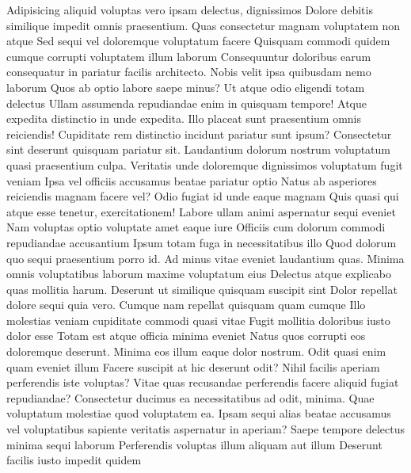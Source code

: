 Adipisicing aliquid voluptas vero ipsam delectus, dignissimos Dolore debitis similique impedit omnis praesentium. Quas consectetur magnam voluptatem non atque Sed sequi vel doloremque voluptatum facere Quisquam commodi quidem cumque corrupti voluptatem illum laborum Consequuntur doloribus earum consequatur in pariatur facilis architecto. Nobis velit ipsa quibusdam nemo laborum Quos ab optio labore saepe minus? Ut atque odio eligendi totam delectus Ullam assumenda repudiandae enim in quisquam tempore! Atque expedita distinctio in unde expedita. Illo placeat sunt praesentium omnis reiciendis! Cupiditate rem distinctio incidunt pariatur sunt ipsum? Consectetur sint deserunt quisquam pariatur sit. Laudantium dolorum nostrum voluptatum quasi praesentium culpa. Veritatis unde doloremque dignissimos voluptatum fugit veniam Ipsa vel officiis accusamus beatae pariatur optio Natus ab asperiores reiciendis magnam facere vel? Odio fugiat id unde eaque magnam Quis quasi qui atque esse tenetur, exercitationem! Labore ullam animi aspernatur sequi eveniet Nam voluptas optio voluptate amet eaque iure Officiis cum dolorum commodi repudiandae accusantium Ipsum totam fuga in necessitatibus illo Quod dolorum quo sequi praesentium porro id. Ad minus vitae eveniet laudantium quas. Minima omnis voluptatibus laborum maxime voluptatum eius Delectus atque explicabo quas mollitia harum. Deserunt ut similique quisquam suscipit sint Dolor repellat dolore sequi quia vero. Cumque nam repellat quisquam quam cumque Illo molestias veniam cupiditate commodi quasi vitae Fugit mollitia doloribus iusto dolor esse Totam est atque officia minima eveniet Natus quos corrupti eos doloremque deserunt. Minima eos illum eaque dolor nostrum. Odit quasi enim quam eveniet illum Facere suscipit at hic deserunt odit? Nihil facilis aperiam perferendis iste voluptas? Vitae quas recusandae perferendis facere aliquid fugiat repudiandae? Consectetur ducimus ea necessitatibus ad odit, minima. Quae voluptatum molestiae quod voluptatem ea. Ipsam sequi alias beatae accusamus vel voluptatibus sapiente veritatis aspernatur in aperiam? Saepe tempore delectus minima sequi laborum Perferendis voluptas illum aliquam aut illum Deserunt facilis iusto impedit quidem

